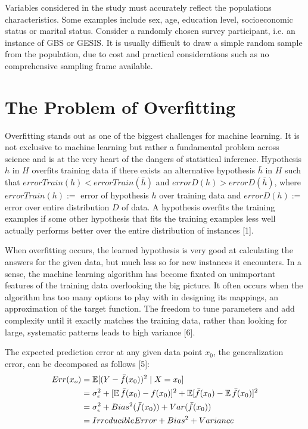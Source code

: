 Variables considered in the study must accurately reflect the populations characteristics. Some examples include sex, age, education level, socioeconomic status or marital status. Consider a randomly chosen survey participant, i.e. an instance of GBS or GESIS. It is usually difficult to draw a simple random sample from the population, due to cost and practical considerations such as no comprehensive sampling frame available.

\section{The Problem of Overfitting}

Overﬁtting stands out as one of the biggest challenges for machine learning. It is not exclusive to machine learning but rather a fundamental problem across science and is at the very heart of the dangers of statistical inference. Hypothesis \(h\) in \(H\) overﬁts training data if there exists an alternative hypothesis \(\bar{h}\) in \(H\) such that \(errorTrain(h) < errorTrain(\bar{h})\) and \(errorD(h) > errorD(\bar{h})\), where \(errorTrain(h):=\) error of hypothesis \(h\) over training data and \(errorD(h):=\) error over entire distribution \(D\) of data. A hypothesis overfits the training examples if some other hypothesis that fits the training examples less well actually performs better over the entire distribution of instances [1].

When overfitting occurs, the learned hypothesis is very good at calculating the answers for the given data, but much less so for new instances it encounters. In a sense, the machine learning algorithm has become ﬁxated on unimportant features of the training data overlooking the big picture. It often occurs when the algorithm has too many options to play with in designing its mappings, an approximation of the target function. The freedom to tune parameters and add complexity until it exactly matches the training data, rather than looking for large, systematic patterns leads to high variance [6].

The expected prediction error at any given data point \(x_0\), the generalization error, can be decomposed as follows [5]: 
\begin{align*}
Err(x_o) &= \operatorname{\mathbb{E}}[(Y - \bar{f}(x_0))^2 \mid X = x_0] \\
& =  \sigma^2_\epsilon + [\operatorname{\mathbb{E}}\bar{f}(x_0) - f(x_0)]^2 + \operatorname{\mathbb{E}}[\bar{f}(x_0) - \operatorname{\mathbb{E}}\bar{f}(x_0)]^2\\
& =  \sigma^2_\epsilon + Bias^2(\bar{f}(x_0)) + Var(\bar{f}(x_0)) \\
& = Irreducible Error + Bias^2 + Variance
\end{align*}

